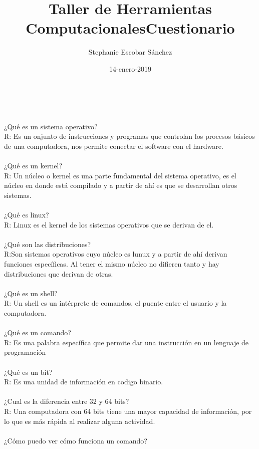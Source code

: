 \documentclass [letterpaper, 12 pts, oneside]{article}
\title{\Huge Taller de Herramientas Computacionales}
\author{Stephanie Escobar Sánchez}
\date{14-enero-2019}
\begin{document}
	\maketitle

	\newpage
	
	\title{\Huge Cuestionario} \\
	\\
	¿Qué es un sistema operativo?\\
	R: Es un onjunto de instrucciones y programas que controlan los procesos básicos de una computadora, nos permite conectar el software con el hardware.\\
	\\
	¿Qué es un kernel?\\
	R: Un núcleo o kernel es una parte fundamental del sistema operativo, es el núcleo en donde está compilado y a partir de ahí es que se desarrollan otros sistemas.\\
	\\
	¿Qué es linux?\\
	R: Linux es el kernel de los sistemas operativos que se derivan de el.\\
	\\
	¿Qué son las distribuciones?\\
	R:Son sistemas operativos cuyo núcleo es lunux y a partir de ahí derivan funciones específicas. Al tener el mismo núcleo no difieren tanto y hay distribuciones que derivan de otras.\\
	\\
	¿Qué es un shell?\\
	R: Un shell es un intérprete de comandos, el puente entre el usuario y la computadora.\\
	\\
	¿Qué es un comando?\\
	R: Es una palabra específica que permite dar una instrucción en un lenguaje de programación\\
	\\
	¿Qué es un bit?\\
	R: Es una unidad de información en codigo binario. \\
	\\
	¿Cual es la diferencia entre 32 y 64 bits?\\
	R: Una computadora con 64 bits tiene una mayor capacidad de información, por lo que es más rápida al realizar alguna actividad.\\
	\\
	¿Cómo puedo ver cómo funciona un comando?\\
\end{document}

